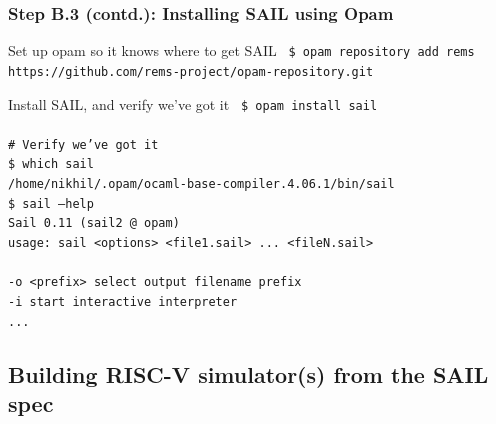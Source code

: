 \documentclass[aspectratio=169]{beamer}
\newcommand{\hm}{\hspace*{1em}}
\newcommand{\scripttt}{\scriptsize\tt}
\begin{document}

\begin{frame}
  \frametitle{Step B.3 (contd.): Installing SAIL using Opam}

  \begin{block}{Set up opam so it knows where to get SAIL}
    {\scripttt
      \hm{}\$ opam repository add rems https://github.com/rems-project/opam-repository.git
    }
  \end{block}

  \begin{block}{Install SAIL, and verify we've got it}
    {\scripttt
      \hm{}\$ opam install sail \\
      \hm{} \\
      \hm{}\# Verify we've got it \\
      \hm{}\$ which sail \\
      \hm{}/home/nikhil/.opam/ocaml-base-compiler.4.06.1/bin/sail \\
      \hm{}\$ sail --help \\
      \hm{}Sail 0.11 (sail2 @ opam) \\
      \hm{}usage: sail <options> <file1.sail> ... <fileN.sail> \\
      \hm{} \\
      \hm{}  -o <prefix>                              select output filename prefix \\
      \hm{}  -i                                       start interactive interpreter \\
      \hm{}  ...
    }
  \end{block}

\end{frame}


\subsection{Building RISC-V simulator(s) from the SAIL spec}

\end{document}

